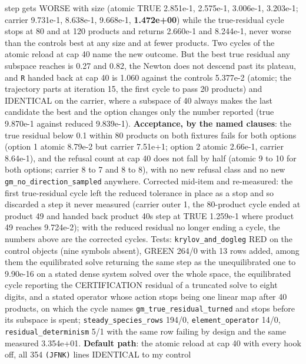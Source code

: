 \documentclass[english,a4paper]{my_memo}
\begin{document}
\begin{itemize}
  step gets WORSE with size (atomic TRUE 2.851e-1, 2.575e-1, 3.006e-1,
  3.203e-1; carrier 9.731e-1, 8.638e-1, 9.668e-1, \textbf{1.472e+00}) while the
  true-residual cycle stops at 80 and at 120 products and returns 2.660e-1 and 8.244e-1,
  never worse than the control\textquotesingle s best at any size and at fewer products.
  Two cycles of the atomic reload at cap 40 name the new outcome. But the
  best true residual any subspace reaches is 0.27 and 0.82, the Newton
  does not descend past its plateau, and \texttt{\textbar{}\textbar{}R\textbar{}\textbar{}} handed back at cap 40 is
  1.060 against the control\textquotesingle s 5.377e-2 (atomic; the trajectory parts at
  iteration 15, the first cycle to pass 20 products) and IDENTICAL on the
  carrier, where a subspace of 40 always makes the last candidate the best
  and the option changes only the number reported (true 9.870e-1 against
  reduced 9.839e-1). \textbf{Acceptance, by the named clauses}: the true
  residual below 0.1 within 80 products on both fixtures fails for both
  options (option 1 atomic 8.79e-2 but carrier 7.51e+1; option 2 atomic 2.66e-1,
  carrier 8.64e-1), and the refusal count at cap 40 does not fall by half
  (atomic 9 to 10 for both options; carrier 8 to 7 and 8 to 8), with no new
  refusal class and no new \texttt{gm\_no\_direction\_sampled} anywhere. Corrected
  mid-item and re-measured: the first true-residual cycle left the reduced
  tolerance in place as a stop and so discarded a step it never measured
  (carrier outer 1, the 80-product cycle ended at product 49 and handed
  back product 40\textquotesingle s step at TRUE 1.259e-1 where product 49 reaches
  9.724e-2); with the reduced residual no longer ending a cycle, the
  numbers above are the corrected cycle\textquotesingle s. Tests: \texttt{krylov\_and\_dogleg} RED on
  the control objects (nine symbols absent), GREEN 264/0 with 13 rows
  added, among them the equilibrated solve returning the same step as the
  unequilibrated one to 9.90e-16 on a stated dense system solved over the
  whole space, the equilibrated cycle reporting the CERTIFICATION residual
  of a truncated solve to eight digits, and a stated operator whose action
  stops being one linear map after 40 products, on which the cycle names
  \texttt{gm\_true\_residual\_turned} and stops before its subspace is spent;
  \texttt{steady\_species\_rows} 194/0, \texttt{element\_operator} 14/0,
  \texttt{residual\_determinism} 5/1 with the same row failing by design and the
  same measured 3.354e+01. \textbf{Default path}: the atomic reload at cap 40
  with every hook off, all 354 \texttt{(JFNK)} lines IDENTICAL to my control

\end{itemize}
\end{document}
